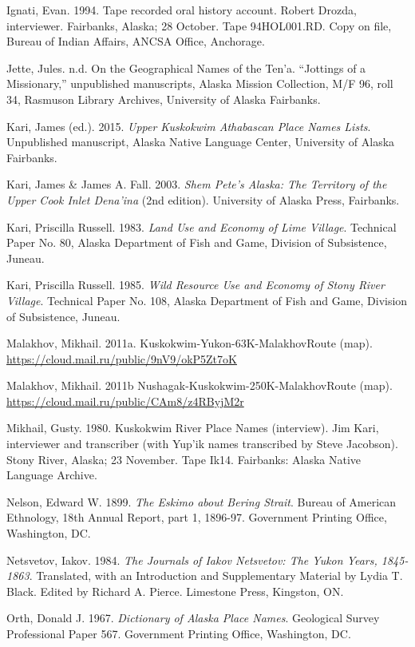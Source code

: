 \begin{hang}
Ignati, Evan. 1994. Tape recorded oral history account. Robert Drozda, interviewer. Fairbanks, Alaska; 28 October. Tape 94HOL001.RD. Copy on file, Bureau of Indian Affairs, ANCSA Office, Anchorage.

Jette, Jules. n.d.	On the Geographical Names of the Ten’a. “Jottings of a Missionary,” unpublished manuscripts, Alaska Mission Collection, M/F 96, roll 34, Rasmuson Library Archives, University of Alaska Fairbanks.

Kari, James (ed.). 2015. \textit{Upper Kuskokwim Athabascan Place Names Lists}. Unpublished manuscript, Alaska Native Language Center, University of Alaska Fairbanks.

Kari, James \& James A. Fall. 2003. \textit{Shem Pete’s Alaska: The Territory of the Upper Cook Inlet Dena’ina} (2nd edition). University of Alaska Press, Fairbanks.

Kari, Priscilla Russell. 1983. \textit{Land Use and Economy of Lime Village}. Technical Paper No. 80, Alaska Department of Fish and Game, Division of Subsistence, Juneau.

Kari, Priscilla Russell. 1985. \textit{Wild Resource Use and Economy of Stony River Village}. Technical Paper No. 108, Alaska Department of Fish and Game, Division of Subsistence, Juneau.

Malakhov, Mikhail. 2011a.	Kuskokwim-Yukon-63K-MalakhovRoute (map). \url{https://cloud.mail.ru/public/9nV9/okP5Zt7oK}

Malakhov, Mikhail. 2011b	Nushagak-Kuskokwim-250K-MalakhovRoute (map). \url{https://cloud.mail.ru/public/CAm8/z4RByjM2r}


Mikhail, Gusty. 1980. Kuskokwim River Place Names (interview). Jim Kari, interviewer and transcriber (with Yup’ik names transcribed by Steve Jacobson). Stony River, Alaska; 23 November. Tape Ik14. Fairbanks: Alaska Native Language Archive.

Nelson, Edward W. 1899.	\textit{The Eskimo about Bering Strait}. Bureau of American Ethnology, 18th Annual Report, part 1, 1896-97. Government Printing Office, Washington, DC.

Netsvetov, Iakov. 1984. \textit{The Journals of Iakov Netsvetov: The Yukon Years, 1845-1863}. Translated, with an Introduction and Supplementary Material by Lydia T. Black. Edited by Richard A. Pierce. Limestone Press, Kingston, ON.

Orth, Donald J. 1967. \textit{Dictionary of Alaska Place Names}. Geological Survey Professional Paper 567. Government Printing Office, Washington, DC.


\end{hang}
